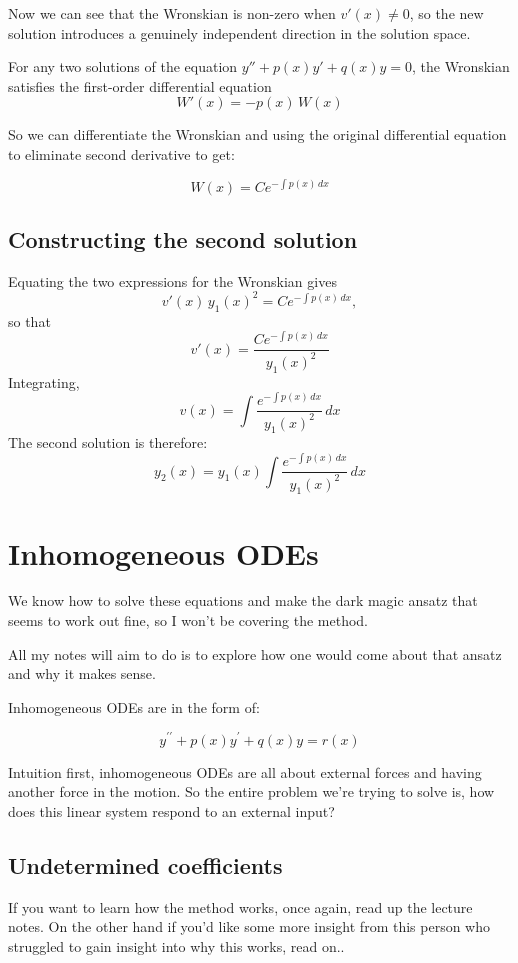 Now we can see that the Wronskian is non-zero when $v'(x) \neq 0$, so the new solution introduces a genuinely independent direction in the solution space. 

For any two solutions of the equation $y'' + p(x)y' + q(x)y = 0$, the Wronskian satisfies the first-order differential equation
$$
W'(x) = -p(x)\,W(x)
$$

So we can differentiate the Wronskian and using the original differential equation to eliminate second derivative to get:

$$
W(x) = C e^{-\int p(x)\,dx}
$$

\subsection{Constructing the second solution}

Equating the two expressions for the Wronskian gives
$$
v'(x)\,y_1(x)^2 = C e^{-\int p(x)\,dx},
$$
so that
$$
v'(x) = \frac{C e^{-\int p(x)\,dx}}{y_1(x)^2}
$$
Integrating,
$$
v(x) = \int \frac{e^{-\int p(x)\,dx}}{y_1(x)^2}\,dx
$$
The second solution is therefore:
$$
y_2(x) = y_1(x)\int \frac{e^{-\int p(x)\,dx}}{y_1(x)^2}\,dx
$$

\section{Inhomogeneous ODEs}

We know how to solve these equations and make the dark magic ansatz that seems to work out fine, so I won't be covering the method. 

All my notes will aim to do is to explore how one would come about that ansatz and why it makes sense. 

Inhomogeneous ODEs are in the form of: 

$$
y^{\prime \prime} + p(x) y^{\prime} + q(x)y = r(x) 
$$

Intuition first, inhomogeneous ODEs are all about external forces and having another force in the motion. So the entire problem we're trying to solve is, how does this linear system respond to an external input? 


\subsection{Undetermined coefficients}

If you want to learn how the method works, once again, read up the lecture notes. On the other hand if you'd like some more insight from this person who struggled to gain insight into why this works, read on.. 

